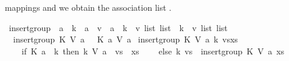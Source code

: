 \begin{isabellebody}
\begin{isamarkuptext}
mappings  and  we obtain the association list .
\newpage%
\end{isamarkuptext}\isamarkuptrue%
\isamarkupfalse%
\ insert{\isacharunderscore}{\kern0pt}group\ {\isacharcolon}{\kern0pt}{\isacharcolon}{\kern0pt}\ {\isachardoublequoteopen}{\isacharparenleft}{\kern0pt}{\isacharprime}{\kern0pt}a\ {\isasymRightarrow}\ {\isacharprime}{\kern0pt}k{\isacharparenright}{\kern0pt}\ {\isasymRightarrow}\ {\isacharparenleft}{\kern0pt}{\isacharprime}{\kern0pt}a\ {\isasymRightarrow}\ {\isacharprime}{\kern0pt}v{\isacharparenright}{\kern0pt}\ {\isasymRightarrow}\ {\isacharprime}{\kern0pt}a\ {\isasymRightarrow}\ {\isacharparenleft}{\kern0pt}{\isacharprime}{\kern0pt}k\ {\isasymtimes}\ {\isacharprime}{\kern0pt}v\ list{\isacharparenright}{\kern0pt}\ list\ {\isasymRightarrow}\ {\isacharparenleft}{\kern0pt}{\isacharprime}{\kern0pt}k\ {\isasymtimes}\ {\isacharprime}{\kern0pt}v\ list{\isacharparenright}{\kern0pt}\ list{\isachardoublequoteclose}\ \isanewline
\ \ {\isachardoublequoteopen}insert{\isacharunderscore}{\kern0pt}group\ K\ V\ a\ {\isacharbrackleft}{\kern0pt}{\isacharbrackright}{\kern0pt}\ {\isacharequal}{\kern0pt}\ {\isacharbrackleft}{\kern0pt}{\isacharparenleft}{\kern0pt}K\ a{\isacharcomma}{\kern0pt}\ {\isacharbrackleft}{\kern0pt}V\ a{\isacharbrackright}{\kern0pt}{\isacharparenright}{\kern0pt}{\isacharbrackright}{\kern0pt}{\isachardoublequoteclose}\isanewline
{\isacharbar}{\kern0pt}\ {\isachardoublequoteopen}insert{\isacharunderscore}{\kern0pt}group\ K\ V\ a\ {\isacharparenleft}{\kern0pt}{\isacharparenleft}{\kern0pt}k{\isacharcomma}{\kern0pt}\ vs{\isacharparenright}{\kern0pt}{\isacharhash}{\kern0pt}xs{\isacharparenright}{\kern0pt}\ {\isacharequal}{\kern0pt}\ {\isacharparenleft}{\kern0pt}\isanewline
\ \ \ \ if\ K\ a\ {\isacharequal}{\kern0pt}\ k\ then\ {\isacharparenleft}{\kern0pt}k{\isacharcomma}{\kern0pt}\ V\ a\ {\isacharhash}{\kern0pt}\ vs{\isacharparenright}{\kern0pt}\ {\isacharhash}{\kern0pt}\ xs\isanewline
\ \ \ \ else\ {\isacharparenleft}{\kern0pt}k{\isacharcomma}{\kern0pt}\ vs{\isacharparenright}{\kern0pt}\ {\isacharhash}{\kern0pt}\ insert{\isacharunderscore}{\kern0pt}group\ K\ V\ a\ xs\ \ \isanewline

\end{isabellebody}

